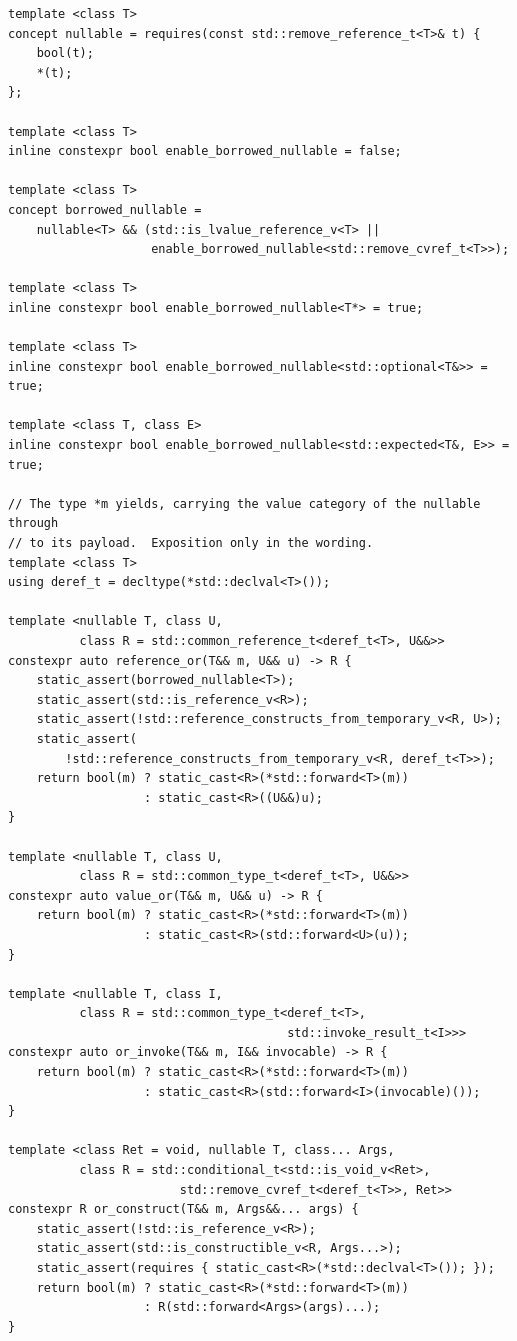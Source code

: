 \documentclass[a4paper,10pt,oneside,openany,final,article]{memoir}
\begin{document}
\begin{verbatim}
template <class T>
concept nullable = requires(const std::remove_reference_t<T>& t) {
    bool(t);
    *(t);
};

template <class T>
inline constexpr bool enable_borrowed_nullable = false;

template <class T>
concept borrowed_nullable =
    nullable<T> && (std::is_lvalue_reference_v<T> ||
                    enable_borrowed_nullable<std::remove_cvref_t<T>>);

template <class T>
inline constexpr bool enable_borrowed_nullable<T*> = true;

template <class T>
inline constexpr bool enable_borrowed_nullable<std::optional<T&>> = true;

template <class T, class E>
inline constexpr bool enable_borrowed_nullable<std::expected<T&, E>> = true;

// The type *m yields, carrying the value category of the nullable through
// to its payload.  Exposition only in the wording.
template <class T>
using deref_t = decltype(*std::declval<T>());

template <nullable T, class U,
          class R = std::common_reference_t<deref_t<T>, U&&>>
constexpr auto reference_or(T&& m, U&& u) -> R {
    static_assert(borrowed_nullable<T>);
    static_assert(std::is_reference_v<R>);
    static_assert(!std::reference_constructs_from_temporary_v<R, U>);
    static_assert(
        !std::reference_constructs_from_temporary_v<R, deref_t<T>>);
    return bool(m) ? static_cast<R>(*std::forward<T>(m))
                   : static_cast<R>((U&&)u);
}

template <nullable T, class U,
          class R = std::common_type_t<deref_t<T>, U&&>>
constexpr auto value_or(T&& m, U&& u) -> R {
    return bool(m) ? static_cast<R>(*std::forward<T>(m))
                   : static_cast<R>(std::forward<U>(u));
}

template <nullable T, class I,
          class R = std::common_type_t<deref_t<T>,
                                       std::invoke_result_t<I>>>
constexpr auto or_invoke(T&& m, I&& invocable) -> R {
    return bool(m) ? static_cast<R>(*std::forward<T>(m))
                   : static_cast<R>(std::forward<I>(invocable)());
}

template <class Ret = void, nullable T, class... Args,
          class R = std::conditional_t<std::is_void_v<Ret>,
                        std::remove_cvref_t<deref_t<T>>, Ret>>
constexpr R or_construct(T&& m, Args&&... args) {
    static_assert(!std::is_reference_v<R>);
    static_assert(std::is_constructible_v<R, Args...>);
    static_assert(requires { static_cast<R>(*std::declval<T>()); });
    return bool(m) ? static_cast<R>(*std::forward<T>(m))
                   : R(std::forward<Args>(args)...);
}


\end{verbatim}
\end{document}
